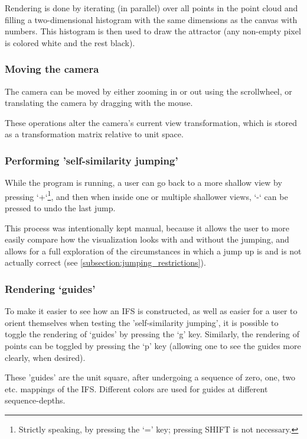 \documentclass[11pt]{article}
\begin{document}
Rendering is done by iterating (in parallel) over all points in the point cloud and filling a two-dimensional histogram with the same dimensions
as the canvas with numbers. 
This histogram is then used to draw the attractor (any non-empty pixel is colored white and the rest black).

\subsubsection{Moving the camera}
\label{sec:org0c796e6}
The camera can be moved by either zooming in or out using the scrollwheel,
or translating the camera by dragging with the mouse.

These operations alter the camera's current view transformation, 
which is stored as a transformation matrix relative to unit space.

\subsubsection{Performing 'self-similarity jumping'}
\label{sec:org9d673fb}

While the program is running, a user can go back to a more shallow view by pressing `+`\footnote{Strictly speaking, by pressing the `=' key; pressing SHIFT is not necessary.}, and then when inside one or multiple shallower views,
`-` can be pressed to undo the last jump.

This process was intentionally kept manual, because it allows the user to more easily compare how
the visualization looks with and without the jumping, and allows for a full exploration of the circumstances
in which a jump up is and is not actually correct (see \autoref{subsection:jumping_restrictions}).
\subsubsection{Rendering `guides'}
\label{sec:orge49fb67}

To make it easier to see how an IFS is constructed, as well as easier for a user to orient themselves when
testing the 'self-similarity jumping', it is possible to toggle the rendering of `guides' by pressing the `g' key.
Similarly, the rendering of points can be toggled by pressing the `p' key (allowing one to see the guides more clearly, when desired).

These 'guides' are the unit square, after undergoing a sequence of zero, one, two etc. mappings of the IFS.
Different colors are used for guides at different sequence-depths.
\end{document}
